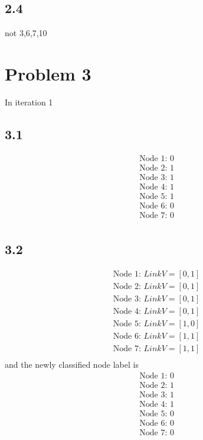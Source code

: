 \documentclass{book}
\begin{document}
\subsection*{2.4}
not 3,6,7,10


\newpage
\section*{Problem 3}
In iteration 1
\subsection*{3.1}
    \begin{align*}
        & \textrm{Node 1: } 0\\
        & \textrm{Node 2: } 1\\
        & \textrm{Node 3: } 1\\
        & \textrm{Node 4: } 1\\
        & \textrm{Node 5: } 1\\
        & \textrm{Node 6: } 0\\
        & \textrm{Node 7: } 0\\
    \end{align*}
    
\subsection*{3.2}
    \begin{align*}
        & \textrm{Node 1: } LinkV= [0, 1]\\
        & \textrm{Node 2: } LinkV= [0, 1]\\
        & \textrm{Node 3: } LinkV= [0, 1]\\
        & \textrm{Node 4: } LinkV= [0, 1]\\
        & \textrm{Node 5: } LinkV= [1, 0]\\
        & \textrm{Node 6: } LinkV= [1, 1]\\
        & \textrm{Node 7: } LinkV= [1, 1]\\
    \end{align*}
and the newly classified node label is 
    \begin{align*}
        & \textrm{Node 1: } 0\\
        & \textrm{Node 2: } 1\\
        & \textrm{Node 3: } 1\\
        & \textrm{Node 4: } 1\\
        & \textrm{Node 5: } 0\\
        & \textrm{Node 6: } 0\\
        & \textrm{Node 7: } 0\\
    \end{align*}
    
\end{document}
